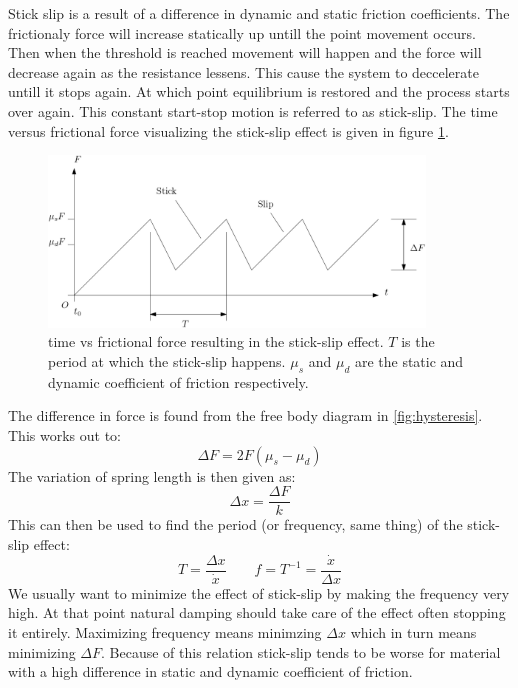 \documentclass[11pt, a4paper]{article}
\numberwithin{equation}{section}
\numberwithin{figure}{section}
\begin{document}
Stick slip is a result of a difference in dynamic and static friction coefficients. The frictionaly force will increase statically up untill the point movement occurs. Then when the threshold is reached movement will happen and the force will decrease again as the resistance lessens. This cause the system to deccelerate untill it stops again. At which point equilibrium is restored and the process starts over again. This constant start-stop motion is referred to as stick-slip. The time versus frictional force visualizing the stick-slip effect is given in figure \ref{fig:stick_slip}.
\begin{figure}[h]
  \centerline{\includegraphics[width=100mm]{images/Hysteresis_3.png}}
  \caption{time vs frictional force resulting in the stick-slip effect. $T$ is the period at which the stick-slip happens. $\mu_s$ and $\mu_d$ are the static and dynamic coefficient of friction respectively.}
  \label{fig:stick_slip}
\end{figure}
The difference in force is found from the free body diagram in \ref{fig:hysteresis}. This works out to:
\begin{equation}
  \Delta F = 2F(\mu_s - \mu_d)
\end{equation}
The variation of spring length is then given as:
\begin{equation}
  \Delta x = \frac{\Delta F}{k}
\end{equation}
This can then be used to find the period (or frequency, same thing) of the stick-slip effect:
\begin{equation}
  T = \frac{\Delta x}{\dot{x}} \qquad f = T^{-1} = \frac{\dot{x}}{\Delta x}
\end{equation}
We usually want to minimize the effect of stick-slip by making the frequency very high. At that point natural damping should take care of the effect often stopping it entirely. Maximizing frequency means minimzing $\Delta x$ which in turn means minimizing $\Delta F$. Because of this relation stick-slip tends to be worse for material with a high difference in static and dynamic coefficient of friction.
\end{document}
